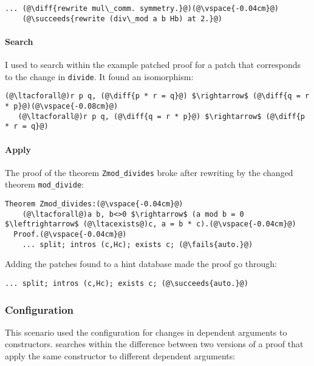 \begin{lstlisting}[language=coq]
    ... (@\diff{rewrite mul\_comm. symmetry.}@)(@\vspace{-0.04cm}@)
    (@\succeeds{rewrite (div\_mod a b Hb) at 2.}@)
\end{lstlisting}

\paragraph{Search} I used \sysname to search within the example patched proof for a patch
that corresponds to the change in \lstinline{divide}.
It found an isomorphism:

\begin{lstlisting}[language=coq]
   (@\ltacforall@)r p q, (@\diff{p * r = q}@) $\rightarrow$ (@\diff{q = r * p}@)(@\vspace{-0.08cm}@)
   (@\ltacforall@)r p q, (@\diff{q = r * p}@) $\rightarrow$ (@\diff{p * r = q}@)
\end{lstlisting}

\paragraph{Apply} The proof of the theorem \lstinline{Zmod_divides} broke after rewriting by the changed theorem \lstinline{mod_divide}:

\begin{lstlisting}[language=coq]
  Theorem Zmod_divides:(@\vspace{-0.04cm}@)
    (@\ltacforall@)a b, b<>0 $\rightarrow$ (a mod b = 0 $\leftrightarrow$ (@\ltacexists@)c, a = b * c).(@\vspace{-0.04cm}@)
  Proof.(@\vspace{-0.04cm}@)
    ... split; intros (c,Hc); exists c; (@\fails{auto.}@)
\end{lstlisting}
Adding the patches \sysname found to a hint database made the proof go through:

\begin{lstlisting}[language=coq]
    ... split; intros (c,Hc); exists c; (@\succeeds{auto.}@)
\end{lstlisting}

\subsubsection{Configuration}

This scenario used the configuration for changes in dependent arguments to constructors.
\sysname searches within the difference between two versions of a proof that apply the same constructor
to different dependent arguments:

